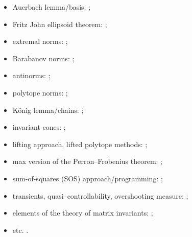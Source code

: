 \documentclass[a4paper,fleqn]{article}
\let\cite=\citep
\begin{document}
\begin{itemize}
  \item Auerbach lemma/basis: \cite{Auerbach:1930, Day:TAMS47, Mandal:2018,
      Ostrovskii:CMB11, Plichko:CM95, Taylor:BAMS47, WebWoj:CCM17};
  \item Fritz John ellipsoid theorem: \cite{ShihHsu:JNCA11, JohnF:48,
      JohnF:2014, Howard97, Shih:TM99};
  \item extremal norms: \cite{ABMW:MTNS12, AhmJng:NAHS16, Bar:ACC95, Bar:CDC05,
      BG:JEP19, BJP:IEEETIT06, CB:IFACWC11, CGSZ:LAA10, CMS:MRB22,
      Dai:JMAA11, DHX:PAMS13, EppWirth:LAA24, EppWirth:MTNS24,
      EppWirth:JMAA26, Gomes:2017, GugProt:FCM13, GugZen:JMAA15,
      GugZen:SIAMJMAA09, GWZ:SIAMJMA05, JP:SIAMJMA09, Koz:CDC05:e,
      Koz:DCDSB10, Koz:WIAS05, LiuXiao:LNCS12, Maesumi:CDC05, Maesumi:LAA08,
      MasWir:LAA14, MejProt:Cacolo23, Moeller15, PW:LAA08, PWB:CDC05,
      Prot:LAA08, Vagnoni08, Wirth:CDC05, Wirth:LAA02, Wirth:MNTS02};
  \item Barabanov norms: \cite{Bar:AIT88-2:e, Bar:AIT88-3:e, Bar:AIT88-5:e,
      BM:ArXiv26, CMS:MRB22, CMS:Cham25-67, Dai:JMAA11, GugZen:JMAA15,
      Koz:Automatica22, Koz:ArXiv25, LP:LAA27, Morris:LAA10,
      Morris:SIAMJMAA12, Morris:SIAMJCO24, Mus:SM23:e, Mus:MN25:e,
      Prot:SIAMJCO22, ProtMus:EJC25, TeiMarg:Autom12, Wirth:CDC05};
  \item antinorms: \cite{GugProt:FCM13, GugZen:JMAA15, GugZen:LAA20, GLP:FCM15,
      Prot:LMA21};
  \item polytope norms: \cite{GWZ:SIAMJMA05, GugZen:SIAMJMAA09, GugZen:JCA07};
  \item K\"{o}nig lemma/chains: \cite{Konig:ALSS27, Mate:PAMS98, Mate:FM99,
      Shen:LAA00, Shih:LAA01, Jachymski:TAMS09};
  \item invariant cones: \cite{Seneta06};
  \item lifting approach, lifted polytope methods: \cite{BN03, JGC:SIAMJMAA14,
      Koz:LAA14, ParJdb:LAA08, JSRToolbox, XuAci:IEEETAC20};
  \item max version of the Perron--Frobenius theorem: \cite{Bapat:LAA98};
  \item sum-of-squares (SOS) approach/programming: \cite{Ahmadi08,
      AhmJun:CDC13, AhmJun14, AJPR:SIAMJCO14, AJPR:HCSS11, AhmPar:CDC05,
      DRD:IEEETAC18, LJP:HSCC16, LPG:SIAM20, ParJdb:LNCS07, ParJdb:LAA08,
      WangMM:ACC21, ZhangXu:ArXiv20};
  \item transients, quasi--controllability, overshooting measure:
    \cite{KKP:IFAC94, KKP:CESA98, KozPok:CADSEM96-005, PW:LAA08,
      PWB:CDC05};
  \item elements of the theory of matrix invariants: \cite{Friedland:AM83,
      Horowitz:CPAM72};
  \item etc. \cite{Bochi:LAA03, Gelf:MatSb41:e,Rota03}.
\end{itemize}
\end{document}
